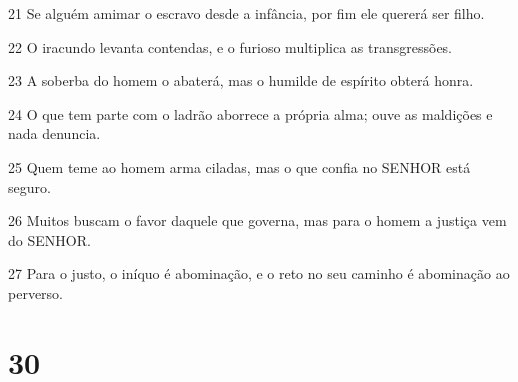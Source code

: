 \par 21 Se alguém amimar o escravo desde a infância, por fim ele quererá ser filho.
\par 22 O iracundo levanta contendas, e o furioso multiplica as transgressões.
\par 23 A soberba do homem o abaterá, mas o humilde de espírito obterá honra.
\par 24 O que tem parte com o ladrão aborrece a própria alma; ouve as maldições e nada denuncia.
\par 25 Quem teme ao homem arma ciladas, mas o que confia no SENHOR está seguro.
\par 26 Muitos buscam o favor daquele que governa, mas para o homem a justiça vem do SENHOR.
\par 27 Para o justo, o iníquo é abominação, e o reto no seu caminho é abominação ao perverso.

\chapter{30}

